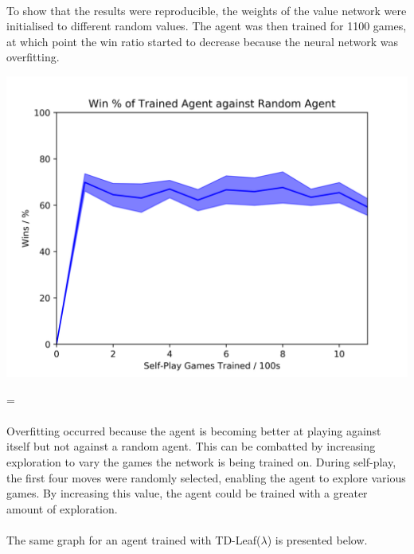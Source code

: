 \documentclass[12pt,a4paper]{book}
\newenvironment{absolutelynopagebreak}
{\par\nobreak\vfil\penalty0\vfilneg
  \vtop\bgroup}
{\par\xdef\tpd{\the\prevdepth}\egroup
  \prevdepth=\tpd}
\begin{document}
\paragraph{} To show that the results were reproducible, the weights of the value network were initialised to different random values. The agent was then trained for 1100 games, at which point the win ratio started to decrease because the neural network was overfitting.

\begin{absolutelynopagebreak}
\begin{center}
  \includegraphics[scale=0.75]{winsreproducelambda.png}
\end{center}
\end{absolutelynopagebreak}

\paragraph{} Overfitting occurred because the agent is becoming better at playing against itself but not against a random agent. This can be combatted by increasing exploration to vary the games the network is being trained on. During self-play, the first four moves were randomly selected, enabling the agent to explore various games. By increasing this value, the agent could be trained with a greater amount of exploration.

\paragraph{} The same graph for an agent trained with TD-Leaf($\lambda$) is presented below.
\end{document}
